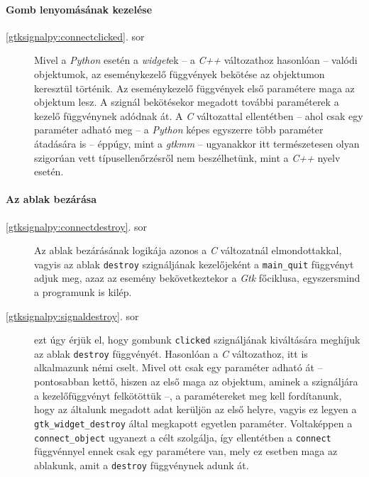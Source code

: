 \paragraph{Gomb lenyomásának kezelése}

\begin{description}
 \item[\ref{gtksignalpy:connectclicked}. sor] Mivel a \textit{Python} esetén a \textit{widget}ek -- a \textit{C++} változathoz hasonlóan --  valódi objektumok, az eseménykezelő függvények bekötése az objektumon keresztül történik. Az eseménykezelő függvények első paramétere maga az objektum lesz. A szignál bekötésekor megadott további paraméterek a kezelő függvénynek adódnak át. A \textit{C} változattal ellentétben -- ahol csak egy paraméter adható meg -- a \textit{Python} képes egyszerre több paraméter átadására is -- éppúgy, mint a \textit{gtkmm} -- ugyanakkor itt természetesen olyan szigorúan vett típusellenőrzésről nem beszélhetünk, mint a \textit{C++} nyelv esetén.
\end{description}

\paragraph{Az ablak bezárása}

\begin{description}
 \item[\ref{gtksignalpy:connectdestroy}. sor] Az ablak bezárásának logikája azonos a \textit{C}  változatnál elmondottakkal, vagyis az ablak \texttt{destroy} szignáljának kezelőjeként a \texttt{main\_quit} függvényt adjuk meg, azaz az esemény bekövetkeztekor a \textit{Gtk} főciklusa, egyszersmind a programunk is kilép.

 \item[\ref{gtksignalpy:signaldestroy}. sor] ezt úgy érjük el, hogy gombunk \texttt{clicked} szignáljának kiváltására meghíjuk az ablak \texttt{destroy} függvényét. Hasonlóan a \textit{C} változathoz, itt is alkalmazunk némi cselt. Mivel ott csak egy paraméter adható át -- pontosabban kettő, hiszen az első maga az objektum, aminek a szignáljára a kezelőfüggvényt felkötöttük --, a paramétereket meg kell fordítanunk, hogy az általunk megadott adat kerüljön az első helyre, vagyis ez legyen a \texttt{gtk\_widget\_destroy} által megkapott egyetlen paraméter. Voltaképpen a \texttt{connect\_object} ugyanezt a célt szolgálja, így ellentétben a \texttt{connect} függvénnyel ennek csak egy paramétere van, mely ez esetben maga az ablakunk, amit a \texttt{destroy} függvénynek adunk át.
\end{description}

